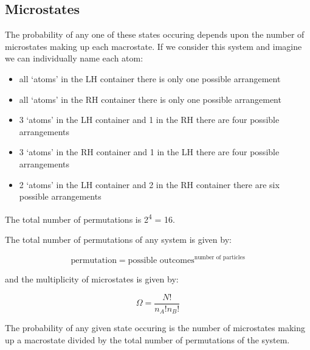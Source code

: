 \documentclass[
]{book}
\providecommand{\tightlist}{%
  \setlength{\itemsep}{0pt}\setlength{\parskip}{0pt}}
\begin{document}
\hypertarget{microstates}{%
\subsection{Microstates}\label{microstates}}

The probability of any one of these states occuring depends upon the number of microstates making up each macrostate. If we consider this system and imagine we can individually name each atom:

\begin{itemize}
\tightlist
\item
  all `atoms' in the LH container there is only one possible arrangement
\item
  all `atoms' in the RH container there is only one possible arrangement
\item
  3 `atoms' in the LH container and 1 in the RH there are four possible arrangements
\item
  3 `atoms' in the RH container and 1 in the LH there are four possible arrangements
\item
  2 `atoms' in the LH container and 2 in the RH container there are six possible arrangements
\end{itemize}

The total number of permutations is 2\textsuperscript{4} = 16.

The total number of permutations of any system is given by:

\begin{equation}
\textrm{permutation}=\textrm{possible outcomes}^\textrm{number of particles}
\label{eq:permutations}
\end{equation}

and the multiplicity of microstates is given by:

\begin{equation}
\Omega = \frac{N!}{n_A!n_B!}
\label{eq:multiplicity}
\end{equation}

The probability of any given state occuring is the number of microstates making up a macrostate divided by the total number of permutations of the system.
\end{document}
